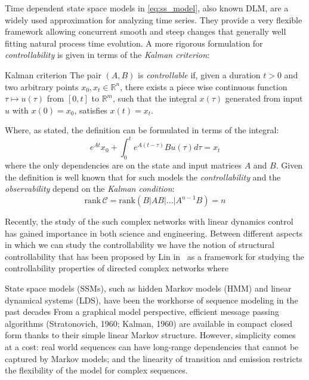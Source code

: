 Time dependent state space models in \eqref{eq:ss_model}, also known \acl{DLM}, are a widely used approximation for analyzing time series. They provide a very flexible framework allowing concurrent smooth and steep changes that generally well fitting natural process time evolution.
A more rigorous formulation for \textit{controllability} is given in terms of the \textit{Kalman criterion}:
\begin{definition}{Kalman criterion}
The pair $(A,B)$ is \textit{controllable} if, given a duration $t>0$ and two arbitrary points $x_0, x_t \in \mathbb{R}^n$, there exists a piece wise continuous function $\tau \mapsto u(\tau)$ from $[0,t]$ to $\mathbb{R}^m$, such that the integral $x(\tau)$ generated from input $u$ with $x(0) = x_0$, satisfies $x(t)=x_t$.
\end{definition}
Where, as stated, the definition can be formulated in terms of the integral:
\begin{equation}
    e^{A t}x_0 + \int_0^t e^{A(t-\tau)}B u(\tau) d\tau = x_t
\end{equation}
where the only dependencies are on the state and input matrices $A$ and $B$.
Given the definition is well known that for such models the \textit{controllability} and the \textit{observability} depend on the \textit{Kalman condition}:
\begin{equation}
    \mathrm{rank}\,\mathscr{C} = \mathrm{rank}\left( B|AB|...|A^{n-1}B \right) = n
\end{equation}

Recently, the study of the such complex networks with linear dynamics control has gained importance in both science and engineering. Between different aspects in which we can study the controllability we have the notion of structural controllability that has been proposed by Lin in~\cite{1100557} as a framework for studying the controllability properties of directed complex networks where

State space models (SSMs), such as hidden Markov models (HMM) and linear dynamical systems
(LDS), have been the workhorse of sequence modeling in the past decades From a graphical model
perspective, efficient message passing algorithms (Stratonovich, 1960; Kalman, 1960) are available
in compact closed form thanks to their simple linear Markov structure. However, simplicity comes
at a cost: real world sequences can have long-range dependencies that cannot be captured by Markov
models; and the linearity of transition and emission restricts the flexibility of the model for complex
sequences.

